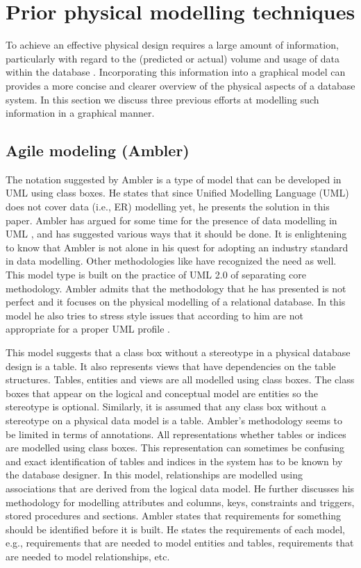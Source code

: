 \documentclass{llncs}
\begin{document}
\section{Prior physical modelling techniques}
\label{sec-previous}

To achieve an effective physical design requires a large amount of
information, particularly with regard to the (predicted or actual)
volume and usage of data within the database \cite{BeDa-P-2003}.
Incorporating this information into a graphical model can provides a
more concise and clearer overview of the physical aspects of a database
system. In this section we discuss three previous efforts at modelling
such information in a graphical manner.


\subsection{Agile modeling (Ambler)}

The notation suggested by Ambler
\cite{Ambl-SW-2003-ADT,Ambl-SW-2004-ObjPrimer3} is a type of model that
can be developed in UML using class boxes. He states that since Unified
Modelling Language (UML) does not cover data (i.e., ER) modelling yet,
he presents the solution in this paper. Ambler has argued for some time
for the presence of data modelling in UML \cite{Ambl-SW-1998-BOA}, and
has suggested various ways that it should be done. It is enlightening to
know that Ambler is not alone in his quest for adopting an industry
standard in data modelling. Other methodologies like
\cite{Naib-EJ-2001-UMLDD} have recognized the need as well. This model
type is built on the practice of UML 2.0 of separating core methodology.
Ambler admits that the methodology that he has presented is not perfect
and it focuses on the physical modelling of a relational database. In
this model he also tries to stress style issues that according to him
are not appropriate for a proper UML profile \cite{Ambl-SW-2003-ADT}.

This model suggests that a class box without a stereotype in a physical
database design is a table. It also represents views that have
dependencies on the table structures. Tables, entities and views are all
modelled using class boxes. The class boxes that appear on the logical
and conceptual model are entities so the stereotype is optional.
Similarly, it is assumed that any class box without a stereotype on a
physical data model is a table. Ambler's methodology seems to be limited
in terms of annotations. All representations whether tables or indices
are modelled using class boxes. This representation can sometimes be
confusing and exact identification of tables and indices in the system
has to be known by the database designer. In this model, relationships
are modelled using associations that are derived from the logical data
model. He further discusses his methodology for modelling attributes and
columns, keys, constraints and triggers, stored procedures and sections.
Ambler states that requirements for something should be identified
before it is built. He states the requirements of each model, e.g.,
requirements that are needed to model entities and tables, requirements
that are needed to model relationships, etc.
\end{document}
